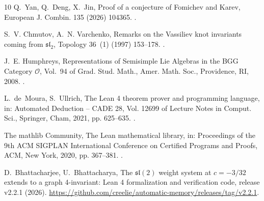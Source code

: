 \documentclass[preprint,12pt]{elsarticle}
\newcommand{\releaseURL}{https://github.com/creelie/automatic-memory/releases/tag/v2.2.1}
\theoremstyle{definition}
\begin{document}
\begin{thebibliography}{10}
Q.~Yan, Q.~Deng, X.~Jin, Proof of a conjecture of {F}omichev and {K}arev,
  European J. Combin. 135 (2026) 104365.
\newblock \href {https://doi.org/10.1016/j.ejc.2026.104365}
  {}.

S.~V. Chmutov, A.~N. Varchenko, Remarks on the {V}assiliev knot invariants
  coming from {$\mathfrak{sl}_2$}, Topology 36~(1) (1997) 153--178.
\newblock \href {https://doi.org/10.1016/0040-9383(95)00071-2}
  {}.

J.~E. Humphreys, Representations of Semisimple {L}ie Algebras in the {BGG}
  Category {$\mathcal{O}$}, Vol.~94 of Grad. Stud. Math., Amer. Math. Soc.,
  Providence, RI, 2008.
\newblock \href {https://doi.org/10.1090/gsm/094} {}.

L.~de~Moura, S.~Ullrich, The {L}ean 4 theorem prover and programming language,
  in: Automated Deduction -- CADE 28, Vol. 12699 of Lecture Notes in Comput.
  Sci., Springer, Cham, 2021, pp. 625--635.
\newblock \href {https://doi.org/10.1007/978-3-030-79876-5_37}
  {}.

{The mathlib Community}, The {L}ean mathematical library, in: Proceedings of
  the 9th ACM SIGPLAN International Conference on Certified Programs and
  Proofs, ACM, New York, 2020, pp. 367--381.
\newblock \href {https://doi.org/10.1145/3372885.3373824}
  {}.


D.~Bhattacharjee, U.~Bhattacharya, The $\mathfrak{sl}(2)$ weight system at $c=-3/32$ extends to a graph 4-invariant: Lean 4 formalization and verification code, release v2.2.1 (2026).
\newblock \url{\releaseURL}.

\end{thebibliography}
\end{document}
